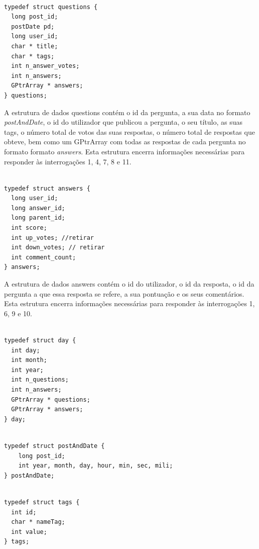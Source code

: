 \documentclass[a4paper]{report}
\begin{document}
\begin{verbatim}

typedef struct questions {
  long post_id;
  postDate pd;
  long user_id;
  char * title;
  char * tags;
  int n_answer_votes;
  int n_answers;
  GPtrArray * answers;
} questions;

\end{verbatim}

A estrutura de dados questions contém o id da pergunta, a sua data no formato
\textit{postAndDate}, o id do utilizador que publicou a pergunta, o seu título,
as suas tags, o número total de votos das suas respostas, o número total de
respostas que obteve, bem como um GPtrArray com todas as respostas de cada
pergunta no formato formato \textit{answers}.
Esta estrutura encerra informações necessárias para responder às interrogações 1,
4, 7, 8 e 11.


\begin{verbatim}

typedef struct answers {
  long user_id;
  long answer_id;
  long parent_id;
  int score;
  int up_votes; //retirar
  int down_votes; // retirar
  int comment_count;
} answers;

\end{verbatim}

A estrutura de dados answers contém o id do utilizador, o id da resposta, o id da
pergunta a que essa resposta se refere, a sua pontuação e os seus comentários.
Esta estrutura encerra informações necessárias para responder às interrogações 1,
6, 9 e 10.

\begin{verbatim}

typedef struct day {
  int day;
  int month;
  int year;
  int n_questions;
  int n_answers;
  GPtrArray * questions;
  GPtrArray * answers;
} day;

\end{verbatim}



\begin{verbatim}

typedef struct postAndDate {
    long post_id;
    int year, month, day, hour, min, sec, mili;
} postAndDate;

\end{verbatim}


\begin{verbatim}

typedef struct tags {
  int id;
  char * nameTag;
  int value;
} tags;

\end{verbatim}
\end{document}
